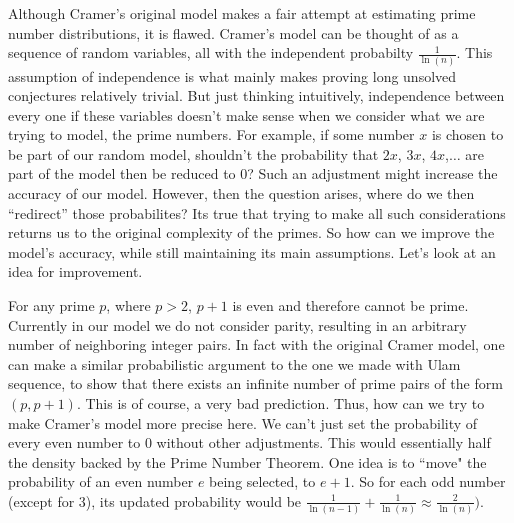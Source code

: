 \documentclass[conference]{IEEEtran}
\begin{document}
Although Cramer's original model makes a fair attempt at estimating prime number distributions, it is flawed. Cramer's model can be thought of as a sequence of random variables, all with the independent probabilty $\frac{1}{\ln(n)}$. This assumption of independence is what mainly makes proving long unsolved conjectures relatively trivial. But just thinking intuitively, independence between every one if these variables doesn't make sense when we consider what we are trying to model, the prime numbers. For example, if some number $x$ is chosen to be part of our random model, shouldn't the probability that $2x$, $3x$, $4x$,$\dots$ are part of the model then be reduced to 0? Such an adjustment might increase the accuracy of our model. However, then the question arises, where do we then ``redirect'' those probabilites? Its true that trying to make all such considerations returns us to the original complexity of the primes. So how can we improve the model's accuracy, while still maintaining its main assumptions. Let's look at an idea for improvement. 

For any prime $p$, where $p > 2$, $p + 1$ is even and therefore cannot be prime. Currently in our model we do not consider parity, resulting in an arbitrary number of neighboring integer pairs. In fact with the original Cramer model, one can make a similar probabilistic argument to the one we made with Ulam sequence, to show that there exists an infinite number of prime pairs of the form $(p, p + 1)$. This is of course, a very bad prediction. Thus, how can we try to make Cramer's model more precise here. We can't just set the probability of every even number to 0 without other adjustments. This would essentially half the density backed by the Prime Number Theorem. One idea is to ``move" the probability of an even number $e$ being selected, to $e + 1$. So for each odd number (except for 3), its updated probability would be $\frac{1}{\ln(n - 1)} + \frac{1}{\ln(n)} \approx \frac{2}{\ln(n)})$.
\end{document}
